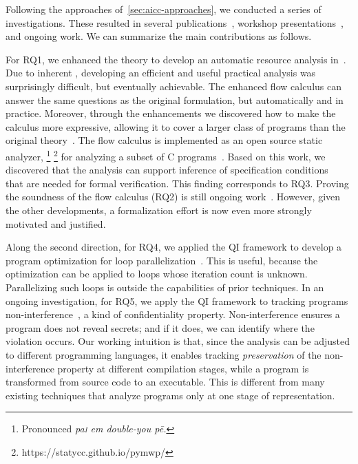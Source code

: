 Following the approaches of~\autoref{sec:aicc-approaches}, we conducted a series
of investigations. These resulted in several
publications~\cite{aubert20222,aubert20232,aubert2023b}, workshop
presentations~\cite{aubert20231,aubert202217,splash22}, and ongoing work.
We can summarize the main contributions as follows.

For RQ1, we enhanced the theory to develop an automatic resource analysis
in~\cite{aubert20222,aubert2023b,rusch2025}. Due to inherent
, developing an efficient and useful
practical analysis was surprisingly difficult, but eventually achievable. The
enhanced flow calculus can answer the same questions as the original
formulation, but automatically and in practice. Moreover, through the
enhancements we discovered how to make the calculus more expressive, allowing it
to cover a larger class of programs than the original theory~\cite{rusch2025}.
The flow calculus is implemented as an open source static analyzer,
%
\footnote{Pronounced \emph{pa\textsc{i} em double-you p\={e}.}}%
\footnote{https://statycc.github.io/pymwp/}
for analyzing a subset
of C programs~\cite{aubert2023b}. Based on this work, we discovered that the
analysis can support inference of specification conditions~\cite{rusch2025} that
are needed for formal verification. This finding corresponds to RQ3. Proving the
soundness of the flow calculus (RQ2) is still
ongoing work~\cite{aubert20232}. However, given the other developments, a
formalization effort is now even more strongly motivated and justified.

Along the second direction, for RQ4, we applied the QI framework to develop a
program optimization for loop parallelization~\cite{aubert20232}. This is
useful, because the optimization can be applied to loops whose iteration count
is unknown. Parallelizing such loops is outside the capabilities of prior
techniques. In an ongoing investigation, for RQ5, we apply the QI framework to
tracking programs {non-interference}~\cite{goguen1982}, a kind of
confidentiality property. Non-interference ensures a
program does not reveal secrets; and if it does, we can identify where the
violation occurs. Our working intuition is that, since the analysis can be
adjusted to different programming languages, it enables tracking
\emph{preservation} of the non-interference property at different compilation
stages, while a program is transformed from source code to an executable. This
is different from many existing techniques that analyze programs only at one
stage of representation.

